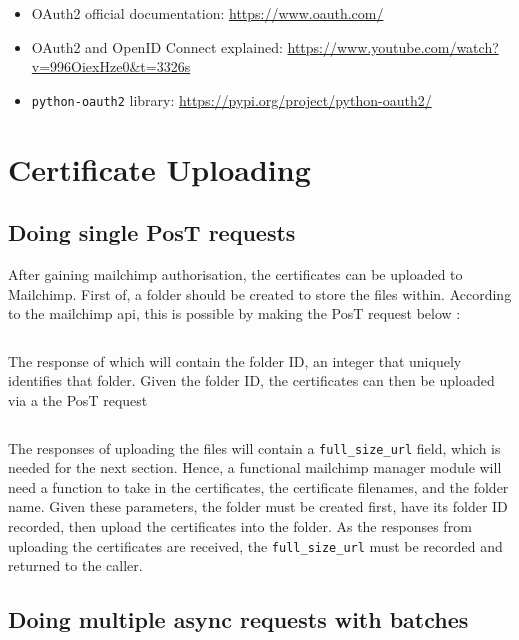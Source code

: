 \documentclass[11pt]{article}
\begin{document}
\begin{itemize}
    \item OAuth2 official documentation: \url{https://www.oauth.com/}
    \item OAuth2 and OpenID Connect explained: \url{https://www.youtube.com/watch?v=996OiexHze0&t=3326s}
    \item \texttt{python-oauth2} \gls{library}: \url{https://pypi.org/project/python-oauth2/}
\end{itemize}

\newpage

\section{Certificate Uploading}

\subsection{Doing single P\acrshort{os}T \gls{request}s}

After gaining \Gls{mailchimp} authorisation, the certificates can be uploaded to Mailchimp. First of, a folder should be created to store the files within. According to the \Gls{mailchimp} \acrshort{api}, this is possible by making the P\acrshort{os}T \gls{request} below \cite{mailchimp-add-folder}:

\inputminted[linenos=true]{python}{mailchimp_examples/create_folder.py}

\noindent
The \gls{response} of which will contain the folder ID, an integer that uniquely identifies that folder. Given the folder ID, the certificates can then be uploaded via a the P\acrshort{os}T \gls{request} \cite{mailchimp-add-file}

\inputminted[linenos=true]{python}{mailchimp_examples/upload_file.py}

\noindent
The \gls{response}s of uploading the files will contain a \texttt{full\_size\_url} field, which is needed for the next section. Hence, a functional \Gls{mailchimp} manager module will need a function to take in the certificates, the certificate filenames, and the folder name. Given these parameters, the folder must be created first, have its folder ID recorded, then upload the certificates into the folder. As the \gls{response}s from uploading the certificates are received, the \texttt{full\_size\_url} must be recorded and returned to the caller.

\subsection{Doing multiple async \gls{request}s with \gls{batch}es}
\end{document}
